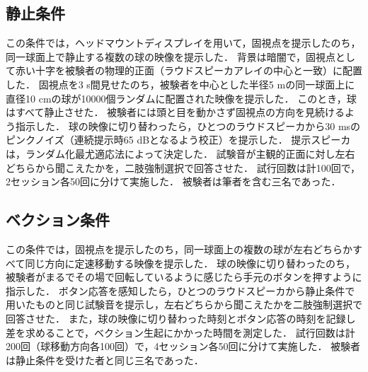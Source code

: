 \documentclass[12pt,a4j]{jsarticle}
\renewcommand{\ }{\hspace{1zw}}
\begin{document}
\raggedright
\subsection{静止条件}
\ この条件では，ヘッドマウントディスプレイを用いて，固視点を提示したのち，同一球面上で静止する複数の球の映像を提示した．
背景は暗闇で，固視点として赤い十字を被験者の物理的正面（ラウドスピーカアレイの中心と一致）に配置した．
固視点を3 s間見せたのち，被験者を中心とした半径5 mの同一球面上に直径10 cmの球が10000個ランダムに配置された映像を提示した．
このとき，球はすべて静止させた．
被験者には頭と目を動かさず固視点の方向を見続けるよう指示した．
球の映像に切り替わったら，ひとつのラウドスピーカから30 msのピンクノイズ（連続提示時65 dBとなるよう校正）を提示した．
提示スピーカは，ランダム化最尤適応法によって決定した．
試験音が主観的正面に対し左右どちらから聞こえたかを，二肢強制選択で回答させた．
試行回数は計100回で，2セッション各50回に分けて実施した．
被験者は筆者を含む三名であった．

\subsection{ベクション条件}
\ この条件では，固視点を提示したのち，同一球面上の複数の球が左右どちらかすべて同じ方向に定速移動する映像を提示した．
球の映像に切り替わったのち，被験者がまるでその場で回転しているように感じたら手元のボタンを押すように指示した．
ボタン応答を感知したら，ひとつのラウドスピーカから静止条件で用いたものと同じ試験音を提示し，左右どちらから聞こえたかを二肢強制選択で回答させた．
また，球の映像に切り替わった時刻とボタン応答の時刻を記録し差を求めることで，ベクション生起にかかった時間を測定した．
試行回数は計200回（球移動方向各100回）で，4セッション各50回に分けて実施した．
被験者は静止条件を受けた者と同じ三名であった．
\end{document}
